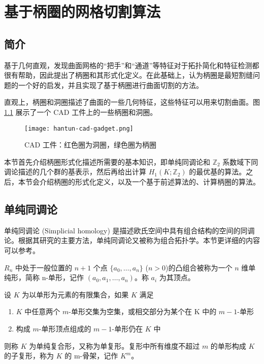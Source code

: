 
\chapter{基于柄圈的网格切割算法}

\section{简介}

\citet{oncomputinghantun} 基于几何直观，发现曲面网格的“把手”和“通道”等特征对于拓扑简化和特征检测都很有帮助，因此提出了柄圈和其形式化定义。在此基础上，\citet{Chai2018}认为柄圈是最短割缝问题的一个好的启发，并且实现了基于柄圈进行曲面切割的方法。

直观上，柄圈和洞圈描述了曲面的一些几何特征，这些特征可以用来切割曲面。图 \ref{fig:hantuncadgadget} 展示了一个 CAD 工件上的一些柄圈和洞圈。

\begin{figure}[h]
    \centering
    \texttt{[image: hantun-cad-gadget.png]}
    \caption{CAD 工件：红色圈为洞圈，绿色圈为柄圈}
    \label{fig:hantuncadgadget}
\end{figure}

本节首先介绍柄圈形式化描述所需要的基本知识，即单纯同调论和 $ \mathbb{Z}_2 $ 系数域下同调论描述的几个群的基表示，然后再给出计算 $ H_1(K; \mathbb{Z}_2) $ 的最优基的算法。之后，本节会介绍柄圈的形式化定义，以及一个基于前述算法的、计算柄圈的算法。

\section{单纯同调论}

单纯同调论 (Simplicial homology) 是描述欧氏空间中具有组合结构的空间的同调论。根据其研究的主要方法，单纯同调论又被称为组合拓扑学。本节更详细的内容可以参考\cite{jctpxjy}。

$ R_n $ 中处于一般位置的 $ n + 1 $ 个点 $ \{a_0, \dots, a_n\} $ ($n > 0$)的凸组合被称为一个 $ n $ 维单纯形，简称 n-单形，记作 $ (a_0, a_1, \dots, a_n) $。称 $ a_i$ 为其顶点。

设 $ K $ 为以单形为元素的有限集合，如果 $ K $ 满足
\begin{enumerate}
    \item $ K $ 中任意两个 $m$-单形交集为空集，或相交部分为某个在 K 中的 $m-1$-单形
    \item 构成 $ m$-单形顶点组成的 $ m - 1 $-单形仍在 $ K $ 中
\end{enumerate}
则称 $ K $ 为单纯复合形，又称为单复形。复形中所有维度不超过 $ m $ 的单形构成 $ K $ 的子复形，称为 $ K $ 的 m-骨架，记作 $ K^m $。

